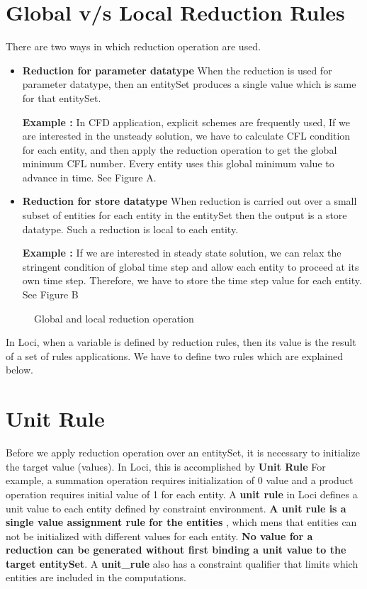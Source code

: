 \section {Global v/s Local Reduction Rules}
There are two ways in which reduction operation are used.
\begin{itemize}
\item  {\bf Reduction for parameter datatype} When the reduction is used for
parameter datatype, then an entitySet produces a single value which is same
for that entitySet.
%
\par {\bf Example :} In CFD application, explicit schemes are frequently used,
If we are interested in the unsteady solution, we have to calculate CFL condition
for each entity, and then apply the reduction operation to get the global
minimum CFL number. Every entity uses this global minimum value to advance in
time. See Figure  A.
%
\item  {\bf Reduction for store datatype} When reduction is carried out over
a small subset of entities for each entity in the entitySet then the output
is a store datatype. Such a reduction is local to each entity.
\par {\bf Example :} If we are interested in steady state solution, we can
relax the stringent condition of global time step and allow each entity to 
proceed at its own time step. Therefore, we have to store the time step value 
for each entity. See Figure  B
\end{itemize}
\begin{figure}[h] 
\vspace{2.50in}\caption { Global and local reduction operation}
\end{figure}
\par In Loci, when a variable is defined by reduction rules, then its value
is the result of a set of rules applications. We have to define two rules
which are explained below.

\section { Unit Rule }
\par Before we apply reduction operation over an entitySet, it is necessary
to initialize the target value (values). In Loci, this is accomplished by
{\bf Unit Rule } For example, a summation operation requires initialization
of 0 value and a product operation requires initial value of 1 for each entity.
A {\bf unit rule} in Loci defines a unit value to each entity defined by
constraint environment. {\bf A unit rule is a single value assignment rule 
for the entities }, which mens that entities can not be initialized with
different values for each entity.
{\bf No value for a reduction can be generated without first binding a unit 
value to the target entitySet}. 
A {\bf unit\_rule} also has a constraint qualifier that limits
which entities are included in the computations.  

